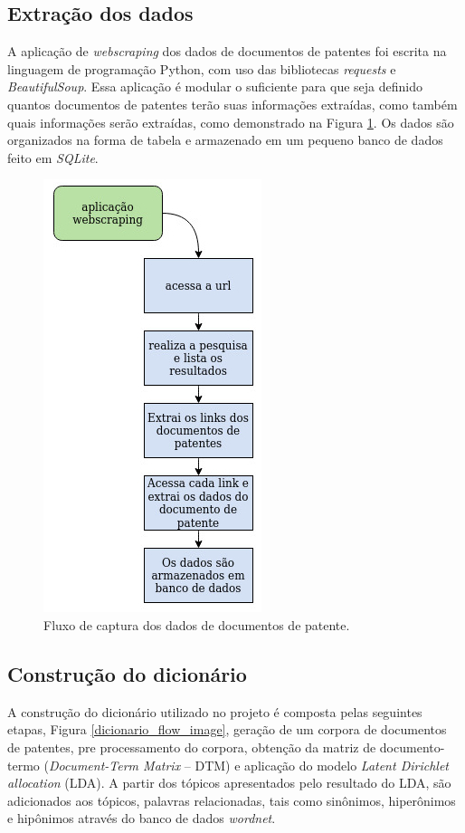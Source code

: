 \subsection{Extração dos dados}
A aplicação de \textit{webscraping} dos dados de documentos de patentes foi escrita na linguagem de programação Python, com uso das bibliotecas \textit{requests} e \textit{BeautifulSoup}. Essa aplicação é modular o suficiente para que seja definido quantos documentos de patentes terão suas informações extraídas, como também quais informações serão extraídas, como demonstrado na Figura \ref{webscraping_flow_image}. Os dados são organizados na forma de tabela e armazenado em um pequeno banco de dados feito em \textit{SQLite}.

\begin{figure}[ht!]
	\centering
	\includegraphics[scale=0.5]{imagens/tcc_webscraping.jpg}
	\caption{Fluxo de captura dos dados de documentos de patente. 
			 \label{webscraping_flow_image}}
\end{figure}


\subsection{Construção do dicionário}
A construção do dicionário utilizado no projeto é composta pelas seguintes etapas, Figura \ref{dicionario_flow_image}, geração de um corpora de documentos de patentes, pre processamento do corpora, obtenção da matriz de documento-termo (\textit{Document-Term Matrix} – DTM) e aplicação do modelo \textit{Latent Dirichlet allocation} (LDA). A partir dos tópicos apresentados pelo resultado do LDA, são adicionados aos tópicos, palavras relacionadas, tais como sinônimos, hiperônimos e hipônimos através do banco de dados \textit{wordnet}.

